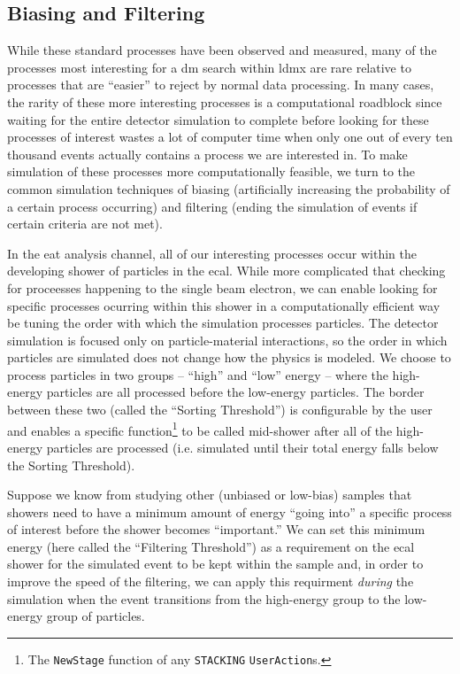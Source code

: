 \subsection{Biasing and Filtering}
While these standard processes have been observed and measured, many of the processes most
interesting for a \ac{dm} search within \ac{ldmx} are rare relative to processes that are
``easier'' to reject by normal data processing.
In many cases, the rarity of these more interesting processes is a computational roadblock
since waiting for the entire detector simulation to complete before looking for these processes
of interest wastes a lot of computer time when only one out of every ten thousand events actually
contains a process we are interested in.
To make simulation of these processes more computationally feasible, we turn to the common simulation
techniques of biasing (artificially increasing the probability of a certain process occurring) and
filtering (ending the simulation of events if certain criteria are not met).


In the \ac{eat} analysis channel, all of our interesting processes occur within the developing
shower of particles in the \ac{ecal}.
While more complicated that checking for proceesses happening to the single beam electron,
we can enable looking for specific processes ocurring within this shower in a computationally
efficient way be tuning the order with which the simulation processes particles.
The detector simulation is focused only on particle-material interactions, so the order 
in which particles are simulated does not change how the physics is modeled.
We choose to process particles in two groups -- ``high'' and ``low'' energy --
where the high-energy particles are all processed before the low-energy particles.
The border between these two (called the ``Sorting Threshold'') is configurable by the user and enables a specific function\footnote{
The \texttt{NewStage} function of any \texttt{STACKING} \texttt{UserAction}s. 
} to be called mid-shower after all of the high-energy particles are processed
(i.e. simulated until their total energy falls below the Sorting Threshold).

Suppose we know from studying other (unbiased or low-bias) samples that showers need to have
a minimum amount of energy ``going into'' a specific process of interest before the shower
becomes ``important.''
We can set this minimum energy (here called the ``Filtering Threshold'') as a requirement on
the \ac{ecal} shower for the simulated event to be kept within the sample and, in order to
improve the speed of the filtering, we can apply this requirment \emph{during} the simulation
when the event transitions from the high-energy group to the low-energy group of particles.


